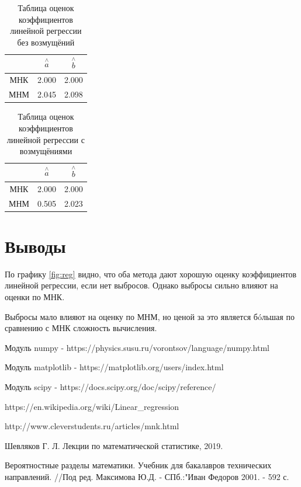\documentclass[a4]{article}
\begin{document}
\begin{table}[H]
\caption{Таблица оценок коэффициентов линейной регрессии без возмущёний}
\label{tab:my_label1}
\begin{center}
\vspace{5mm}
\begin{tabular}{|c|c|c|}
\hline
& $\overset{\wedge}{a}$ & $\overset{\wedge}{b}$\\
\hline
МНК &2.000&2.000\\
\hline
МНМ &2.045&2.098\\
\hline
\end{tabular}
\end{center}
\end{table}


\begin{table}[H]
\caption{Таблица оценок коэффициентов линейной регрессии с возмущёниями}
\label{tab:my_label2}
\begin{center}
\vspace{5mm}
\begin{tabular}{|c|c|c|}
\hline
& $\overset{\wedge}{a}$ & $\overset{\wedge}{b}$\\
\hline
МНК &2.000&2.000\\
\hline
МНМ &0.505 &2.023\\
\hline
\end{tabular}
\end{center}
\end{table}



\section{Выводы}
По графику \ref{fig:reg} видно, что оба метода дают хорошую оценку коэффициентов линейной регрессии, если нет выбросов. Однако выбросы сильно влияют на оценки по МНК.

Выбросы мало влияют на оценку по МНМ, но ценой за это является б\'oльшая по сравнению с МНК сложность вычисления.



\begin{thebibliography}{}
      Модуль numpy  -  https://physics.susu.ru/vorontsov/language/numpy.html
    
    Модуль matplotlib - https://matplotlib.org/users/index.html
    
    Модуль scipy - https://docs.scipy.org/doc/scipy/reference/
    
    https://en.wikipedia.org/wiki/Linear\_regression

http://www.cleverstudents.ru/articles/mnk.html

Шевляков Г. Л. Лекции по математической статистике, 2019.

Вероятностные разделы математики. Учебник для бакалавров технических направлений. //Под ред. Максимова Ю.Д. - СПб.:"Иван Федоров 2001. - 592 с.


\end{thebibliography}
\end{document}
